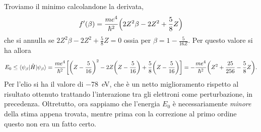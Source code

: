 Troviamo il minimo calcolandone la derivata,
\begin{equation}
    f'(\beta)=\frac{me^4}{\hbar^2}\Bigl(2Z^2\beta-2Z^2+\frac58Z\Bigr)
\end{equation}
che si annulla se $2Z^2\beta-2Z^2+\frac58Z=0$ ossia per $\beta=1-\frac5{16Z}$.
Per questo valore si ha allora
\begin{equation}
    E_0\le
    \langle\psi_\beta\rvert\hat{H}\lvert\psi_\beta\rangle=
    \frac{me^4}{\hbar^2}\biggl[\bigg(Z-\frac5{16}\bigg)^2-2Z\biggl(Z-\frac5{16}\biggr)+\frac58\bigg(Z-\frac5{16}\biggr)\biggr]=
    -\frac{me^4}{\hbar^2}\biggl(Z^2+\frac{25}{256}-\frac58Z\biggr).
\end{equation}
Per l'elio si ha il valore di \SI{-78}{\electronvolt}, che è un netto miglioramento rispetto al risultato ottenuto trattando l'interazione tra gli elettroni come perturbazione, in precedenza.
Oltretutto, ora sappiamo che l'energia $E_0$ è necessariamente \emph{minore} della stima appena trovata, mentre prima con la correzione al primo ordine questo non era un fatto certo.
